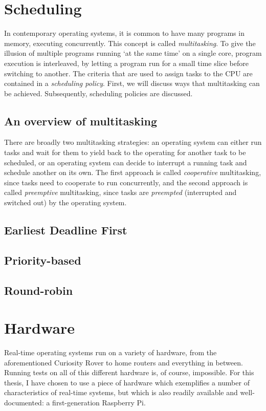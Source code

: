 \documentclass[twoside]{uva-inf-bachelor-thesis}
\begin{document}
\section{Scheduling}
In contemporary operating systems, it is common to have many programs in memory, executing concurrently. This concept is called \textit{multitasking}. To give the illusion of multiple programs running `at the same time' on a single core, program execution is interleaved, by letting a program run for a small time slice before switching to another. The criteria that are used to assign tasks to the CPU are contained in a \textit{scheduling policy}. First, we will discuss ways that multitasking can be achieved. Subsequently, scheduling policies are discussed.

\subsection{An overview of multitasking}
There are broadly two multitasking strategies\cite[\S 6.1.3]{osconcepts}: an operating system can either run tasks and wait for them to yield back to the operating for another task to be scheduled, or an operating system can decide to interrupt a running task and schedule another on its own. The first approach is called \textit{cooperative} multitasking, since tasks need to cooperate to run concurrently, and the second approach is called \textit{preemptive} multitasking, since tasks are \textit{preempted} (interrupted and switched out) by the operating system.

\subsection{}

\subsection{Earliest Deadline First}

\subsection{Priority-based}

\subsection{Round-robin}

\section{Hardware}
Real-time operating systems run on a variety of hardware, from the aforementioned Curiosity Rover to home routers and everything in between. Running tests on all of this different hardware is, of course, impossible. For this thesis, I have chosen to use a piece of hardware which exemplifies a number of characteristics of real-time systems, but which is also readily available and well-documented: a first-generation Raspberry Pi.
\end{document}
